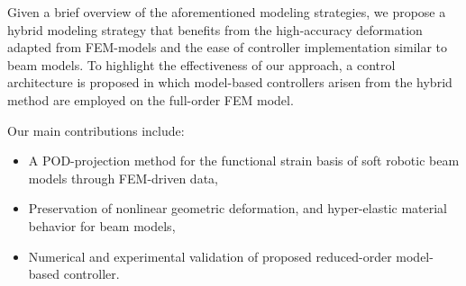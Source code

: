 Given a brief overview of the aforementioned modeling strategies,
we propose a hybrid modeling strategy that benefits from the high-accuracy deformation adapted from FEM-models and the ease of controller implementation similar to beam models. To highlight the effectiveness of our approach, a control architecture is proposed in which model-based controllers arisen from the hybrid method are employed on the full-order FEM model.

Our main contributions include:
\begin{itemize}
\item A POD-projection method for the functional strain basis of soft robotic beam models through FEM-driven data,
\item Preservation of nonlinear geometric deformation, and hyper-elastic material behavior for beam models,
\item Numerical and experimental validation of proposed reduced-order model-based controller.
\end{itemize}
